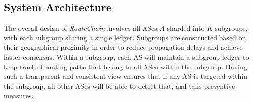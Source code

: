 \documentclass[conference]{IEEEtran}
\newcommand{\rc}{{{\em RouteChain}}\xspace}
\begin{document}
{\def\arraystretch{1}
\begin{table}\caption{Symbols and Definition}
\centering
{}
\label{tab:one}
\end{table} } 

\subsection{System Architecture}\label{sec:do}
The overall design of \rc involves all ASes $A$ sharded into $K$ subgroups, with each subgroup sharing a single ledger. Subgroups are constructed based on their geographical proximity in order to reduce propagation delays and achieve faster consensus. Within a subgroup, each AS will maintain a subgroup ledger to keep track of routing paths that belong to all ASes within the subgroup. Having such a transparent and consistent view ensures that if any AS is targeted within the subgroup, all other ASes will be able to detect that, and take preventive measures. 
\end{document}
